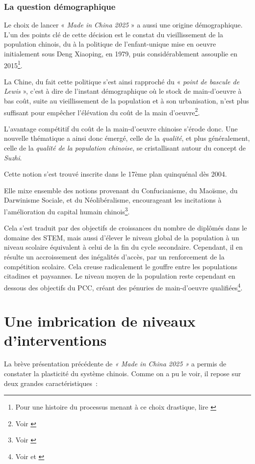 \documentclass[a4paper]{article}
\begin{document}
\subsubsection{La question démographique}
\label{sec:org2d752fd}
Le choix de lancer « \textit{Made in China 2025} » a aussi une origine démographique.  L’un des points clé de cette décision est le constat du vieillissement de la population chinois, du à la politique de l’enfant-unique mise en oeuvre initialement sous Deng Xiaoping, en 1979, puis considérablement assouplie en 2015\footnote{Pour une histoire du processus menant à ce choix drastique, lire \cite{greenhalgh08_just}}.

La Chine, du fait cette politique s’est ainsi rapproché du « \textit{point de bascule de Lewis} », c’est à dire de l’instant démographique où le stock de main-d’oeuvre à bas coût, suite au vieillissement de la population et à son urbanisation, n’est plus suffisant pour empêcher l’élévation du coût de la main d’oeuvre\footnote{Voir \cite{dollar20_china}}.

L’avantage compétitif du coût de la main-d’oeuvre chinoise s’érode donc. Une nouvelle thématique a ainsi donc émergé, celle de la \textit{qualité}, et plus généralement, celle de la \textit{qualité de la population chinoise}, se cristallisant autour du concept de \textit{Suzhi}.

Cette notion s’est trouvé inscrite dans le 17ème plan quinquénal dès 2004. 

Elle mixe ensemble des notions provenant du Confucianisme, du Maoïsme, du Darwinisme Sociale, et du Néolibéralisme, encourageant les incitations à l’amélioration du capital humain chinois\footnote{Voir \cite{greenhalgh10_cultiv}}.

Cela s’est traduit par des objectifs de croissances du nombre de diplômés dans le domaine des STEM, mais aussi d’élever le niveau global de la population à un niveau scolaire équivalent à celui de la fin du cycle secondaire. Cependant, il en résulte un accroissement des inégalités d’accès, par un renforcement de la compétition scolaire. Cela creuse radicalement le gouffre entre les populations citadines et paysannes. Le niveau moyen de la population reste cependant en dessous des objectifs du PCC, créant des pénuries de main-d’oeuvre qualifiées\footnote{Voir \cite{simon09_chinas} et \cite{xiaolan15_chinas}}.


\section{Une imbrication de niveaux d’interventions}
\label{sec:org0a2f1cf}
La brève présentation précédente de \textit{« Made in China 2025 »} a permis de constater la plasticité du système chinois. Comme on a pu le voir, il repose sur deux grandes caractéristiques~:
\end{document}
